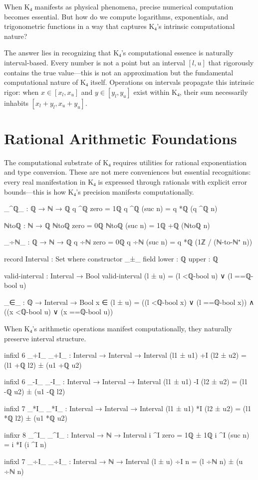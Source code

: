 \documentclass[11pt,a4paper]{book}
\begin{document}
When K₄ manifests as physical phenomena, precise numerical computation becomes essential. But how do we compute logarithms, exponentials, and trigonometric functions in a way that captures K₄'s intrinsic computational nature?

The answer lies in recognizing that K₄'s computational essence is naturally interval-based. Every number is not a point but an interval $[l, u]$ that rigorously contains the true value—this is not an approximation but the fundamental computational nature of K₄ itself.
Operations on intervals propagate this intrinsic rigor: when $x \in [x_l, x_u]$ and $y \in [y_l, y_u]$ exist within K₄, their sum necessarily inhabits $[x_l + y_l, x_u + y_u]$.

\section{Rational Arithmetic Foundations}

The computational substrate of K₄ requires utilities for rational exponentiation and type conversion.
These are not mere conveniences but essential recognitions: every real manifestation in K₄ is expressed through rationals with explicit error bounds—this is how K₄'s precision manifests computationally.

\begin{code}
_^ℚ_ : ℚ → ℕ → ℚ
q ^ℚ zero = 1ℚ
q ^ℚ (suc n) = q *ℚ (q ^ℚ n)

ℕtoℚ : ℕ → ℚ
ℕtoℚ zero = 0ℚ
ℕtoℚ (suc n) = 1ℚ +ℚ (ℕtoℚ n)

_÷ℕ_ : ℚ → ℕ → ℚ
q ÷ℕ zero = 0ℚ
q ÷ℕ (suc n) = q *ℚ (1ℤ / (ℕ-to-ℕ⁺ n))
\end{code}

\begin{code}
record Interval : Set where
  constructor _±_
  field
    lower : ℚ
    upper : ℚ

valid-interval : Interval → Bool
valid-interval (l ± u) = (l <ℚ-bool u) ∨ (l ==ℚ-bool u)

_∈_ : ℚ → Interval → Bool
x ∈ (l ± u) = ((l <ℚ-bool x) ∨ (l ==ℚ-bool x)) ∧ ((x <ℚ-bool u) ∨ (x ==ℚ-bool u))
\end{code}

When K₄'s arithmetic operations manifest computationally, they naturally preserve interval structure.

\begin{code}
infixl 6 _+I_
_+I_ : Interval → Interval → Interval
(l1 ± u1) +I (l2 ± u2) = (l1 +ℚ l2) ± (u1 +ℚ u2)

infixl 6 _-I_
_-I_ : Interval → Interval → Interval
(l1 ± u1) -I (l2 ± u2) = (l1 -ℚ u2) ± (u1 -ℚ l2)

infixl 7 _*I_
_*I_ : Interval → Interval → Interval
(l1 ± u1) *I (l2 ± u2) = 
  (l1 *ℚ l2) ± (u1 *ℚ u2)

infixr 8 _^I_
_^I_ : Interval → ℕ → Interval
i ^I zero = 1ℚ ± 1ℚ
i ^I (suc n) = i *I (i ^I n)

infixl 7 _÷I_
_÷I_ : Interval → ℕ → Interval
(l ± u) ÷I n = (l ÷ℕ n) ± (u ÷ℕ n)
\end{code}
\end{document}
